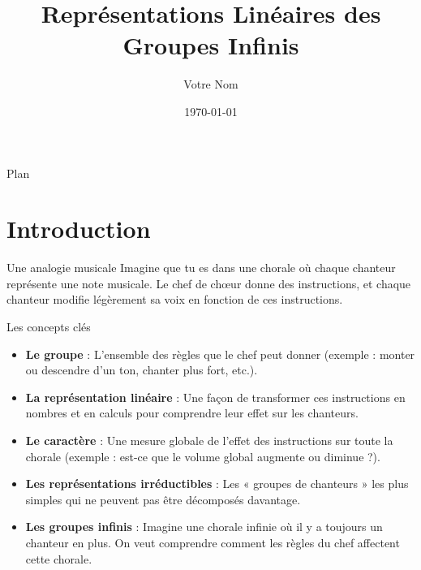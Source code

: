 \documentclass[french]{beamer}
\title{Représentations Linéaires des Groupes Infinis}
\author{Votre Nom}
\institute{Votre Université}
\date{\today}
\begin{document}
	
	\begin{frame}
		\titlepage
	\end{frame}
	
	\begin{frame}{Plan}
		\tableofcontents
	\end{frame}
	
	\section{Introduction}
	\begin{frame}{Une analogie musicale}
		Imagine que tu es dans une chorale où chaque chanteur représente une note musicale.\newline
		Le chef de chœur donne des instructions, et chaque chanteur modifie légèrement sa voix en fonction de ces instructions.
	\end{frame}
	
	\begin{frame}{Les concepts clés}
		\begin{itemize}
			\item \textbf{Le groupe} : L'ensemble des règles que le chef peut donner (exemple : monter ou descendre d'un ton, chanter plus fort, etc.).
			\item \textbf{La représentation linéaire} : Une façon de transformer ces instructions en nombres et en calculs pour comprendre leur effet sur les chanteurs.
			\item \textbf{Le caractère} : Une mesure globale de l'effet des instructions sur toute la chorale (exemple : est-ce que le volume global augmente ou diminue ?).
			\item \textbf{Les représentations irréductibles} : Les « groupes de chanteurs » les plus simples qui ne peuvent pas être décomposés davantage.
			\item \textbf{Les groupes infinis} : Imagine une chorale infinie où il y a toujours un chanteur en plus. On veut comprendre comment les règles du chef affectent cette chorale.
		\end{itemize}
	\end{frame}
	
\end{document}
